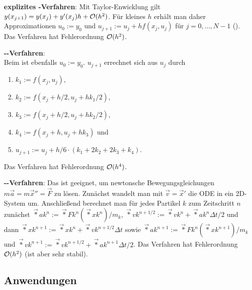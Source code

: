 \textbf{explizites -Verfahren}:
Mit Taylor-Enwicklung gilt $y(x_{j+1}) = y(x_j) + y'(x_j) h + \mathcal{O}(h^2)$.
Für kleines $h$ erhält man daher Approximationen
$u_0 := y_0$ und $u_{j+1} := u_j + h f(x_j, u_j)$ für $j = 0, \dotsc, N-1$
().
Das Verfahren hat Fehlerordnung $\mathcal{O}(h^2)$.

\linie

\textbf{--Verfahren}:\\
Beim  ist ebenfalls $u_0 := y_0$.
$u_{j+1}$ errechnet sich aus $u_j$ durch
\begin{enumerate}
    \item
    $k_1 := f(x_j, u_j)$,
    
    \item
    $k_2 := f(x_j + h/2, u_j + hk_1/2)$,
    
    \item
    $k_3 := f(x_j + h/2, u_j + hk_2/2)$,
    
    \item
    $k_4 := f(x_j + h, u_j + hk_3)$ und
    
    \item
    $u_{j+1} := u_j + h/6 \cdot (k_1 + 2k_2 + 2k_3 + k_4)$.
\end{enumerate}
Das Verfahren hat Fehlerordnung $\mathcal{O}(h^4)$.

\linie

\textbf{--Verfahren}:
Das  ist geeignet,
um newtonsche Bewegungsgleichungen $m\vec{a} = m\vec{x}'' = \vec{F}$ zu lösen.
Zunächst wandelt man mit $\vec{v} = \vec{x}'$ die ODE in ein 2D-System um.
Anschließend berechnet man für jedes Partikel $k$ zum Zeitschritt $n$ zunächst
$\vec*{a}{k}^n := \vec*{F}{k}^n(\vec*{x}{k}^n)/m_k$,
$\vec*{v}{k}^{n+1/2} := \vec*{v}{k}^n + \vec*{a}{k}^n \Delta t/2$ und dann
$\vec*{x}{k}^{n+1} := \vec*{x}{k}^n + \vec*{v}{k}^{n+1/2} \Delta t$ sowie
$\vec*{a}{k}^{n+1} := \vec*{F}{k}^n(\vec*{x}{k}^{n+1})/m_k$ und
$\vec*{v}{k}^{n+1} := \vec*{v}{k}^{n+1/2} + \vec*{a}{k}^{n+1} \Delta t/2$.
Das Verfahren hat Fehlerordnung $\mathcal{O}(h^2)$ (ist aber sehr stabil).

\pagebreak

\subsection{%
    Anwendungen%
}

